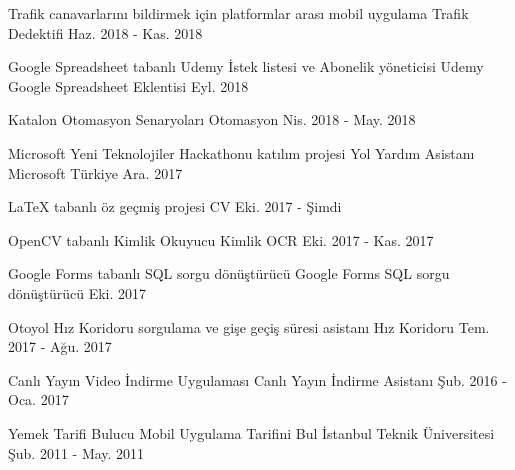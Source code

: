 \begin{cventries}
  \cventry
    {Trafik canavarlarını bildirmek için platformlar arası mobil uygulama} %
    {Trafik Dedektifi} %
    {} %
    {Haz. 2018 - Kas. 2018} %
    {}

  \cventry
    {Google Spreadsheet tabanlı Udemy İstek listesi ve Abonelik yöneticisi} %
    {Udemy Google Spreadsheet Eklentisi} %
    {} %
    {Eyl. 2018} %
    {}

  \cventry
    {Katalon Otomasyon Senaryoları} %
    {Otomasyon} %
    {} %
    {Nis. 2018 - May. 2018} %
    {}

  \cventry
    {Microsoft Yeni Teknolojiler Hackathonu katılım projesi} %
    {Yol Yardım Asistanı} %
    {Microsoft Türkiye} %
    {Ara. 2017} %
    {}

  \cventry
    {LaTeX tabanlı öz geçmiş projesi} %
    {CV} %
    {} %
    {Eki. 2017 - Şimdi} %
    {}

  \cventry
    {OpenCV tabanlı Kimlik Okuyucu} %
    {Kimlik OCR} %
    {} %
    {Eki. 2017 - Kas. 2017} %
    {}

  \cventry
    {Google Forms tabanlı SQL sorgu dönüştürücü} %
    {Google Forms SQL sorgu dönüştürücü} %
    {} %
    {Eki. 2017} %
    {}

  \cventry
    {Otoyol Hız Koridoru sorgulama ve gişe geçiş süresi asistanı} %
    {Hız Koridoru} %
    {} %
    {Tem. 2017 - Ağu. 2017} %
    {}

  \cventry
    {Canlı Yayın Video İndirme Uygulaması} %
    {Canlı Yayın İndirme Asistanı} %
    {} %
    {Şub. 2016 - Oca. 2017} %
    {}

  \cventry
    {Yemek Tarifi Bulucu Mobil Uygulama} %
    {Tarifini Bul} %
    {İstanbul Teknik Üniversitesi} %
    {Şub. 2011 - May. 2011} %
    {}

\end{cventries}
